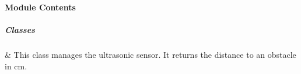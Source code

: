 \documentclass[letterpaper,10pt,english]{sphinxmanual}
\begin{document}
\sphinxstepscope


\subsubsection{}
\label{\detokenize{autoapi/robotlibrary/ultrasonic/index:module-robotlibrary.ultrasonic}}\label{\detokenize{autoapi/robotlibrary/ultrasonic/index:robotlibrary-ultrasonic}}\label{\detokenize{autoapi/robotlibrary/ultrasonic/index::doc}}

\paragraph{Module Contents}
\label{\detokenize{autoapi/robotlibrary/ultrasonic/index:module-contents}}

\subparagraph{Classes}
\label{\detokenize{autoapi/robotlibrary/ultrasonic/index:classes}}

\begin{savenotes}\sphinxattablestart
\sphinxthistablewithglobalstyle
\sphinxthistablewithnovlinesstyle
\centering
\begin{tabulary}{\linewidth}[t]{}
\sphinxtoprule
\sphinxtableatstartofbodyhook
\sphinxAtStartPar
{\hyperref[\detokenize{autoapi/robotlibrary/ultrasonic/index:robotlibrary.ultrasonic.Ultra}]{}}
&
\sphinxAtStartPar
This class manages the ultrasonic sensor. It returns the distance to an obstacle in cm.
\\
\sphinxbottomrule
\end{tabulary}
\sphinxtableafterendhook\par
\sphinxattableend\end{savenotes}
\end{document}

